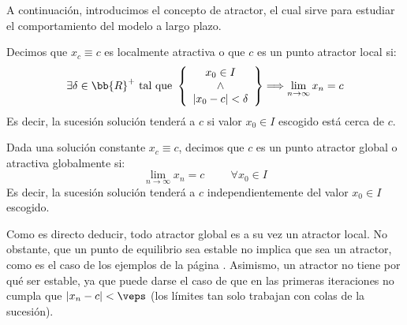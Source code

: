A continuación, introducimos el concepto de atractor, el cual sirve para estudiar el comportamiento del modelo a largo plazo.
\begin{definicion}
    Decimos que $x_c\equiv c$ es localmente atractiva o que $c$ es un punto atractor local si:
    \begin{equation*}
        \exists \delta \in \bb{R}^+ \text{ tal que } \left\{\begin{array}{c}
            x_0\in I \\ \land \\ |x_0-c| < \delta
        \end{array}\right\} \Longrightarrow \lim_{n \to \infty} x_n = c
    \end{equation*}
    Es decir, la sucesión solución tenderá a $c$ si valor $x_0\in I$ escogido está cerca de $c$.
\end{definicion}

\begin{definicion}
 Dada una solución constante $x_c\equiv c$, decimos que $c$ es un punto atractor global o atractiva globalmente si:
    \begin{equation*}
        \lim_{n \to \infty} x_n = c \hspace{1cm} \forall x_0 \in I
    \end{equation*}
    Es decir, la sucesión solución tenderá a $c$ independientemente del valor $x_0\in I$ escogido.
    \begin{comment}
        \begin{equation*}
        \exists \delta \in \bb{R}^+ \mid |x_0-c| < \delta \Longrightarrow \lim_{n \to \infty} x_n = c \qquad \forall x_0 \in I
    \end{equation*}
    \end{comment}
\end{definicion}

Como es directo deducir, todo atractor global es a su vez un atractor local. No obstante, que un punto de equilibrio sea estable no implica que sea un atractor, como es el caso de los ejemplos de la página \pageref{ejemplo:estabilidad}. Asimismo, un atractor no tiene por qué ser estable, ya que puede darse el caso de que en las primeras iteraciones no cumpla que $|x_n-c|<\veps$ (los límites tan solo trabajan con colas de la sucesión).

